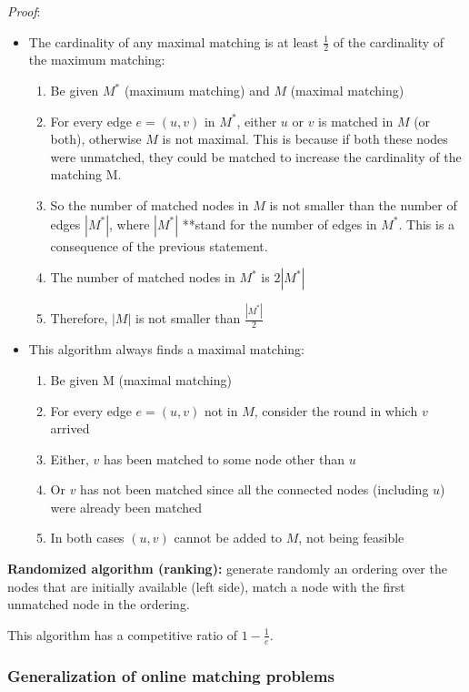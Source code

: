\documentclass[10pt,a4paper]{article}
\begin{document}
\textit{Proof}:

\begin{itemize}

\item The cardinality of any maximal matching is at least $\frac{1}{2}$ of the cardinality of the maximum matching:
\begin{enumerate}
\item Be given $M^*$ (maximum matching) and $M$ (maximal matching)
\item For every edge $e = (u,v)$ in $M^*$, either $u$ or $v$ is matched in $M$ (or both), otherwise $M$ is not maximal. This is because if both these nodes were unmatched, they could be matched to increase the cardinality of the matching M.
\item So the number of matched nodes in $M$ is not smaller than the number of edges $|M^*|$, where $|M^*|$ **stand for the number of edges in $M^*$. This is a consequence of the previous statement.
\item The number of matched nodes in $M^*$ is $2|M^*|$
\item Therefore, $|M|$ is not smaller than $\frac{|M^*|}{2}$
\end{enumerate}
\item This algorithm always finds a maximal matching:
\begin{enumerate}
\item Be given M (maximal matching)
\item For every edge $e = (u,v)$ not in $M$, consider the round in which $v$ arrived
\item Either, $v$ has been matched to some node other than $u$
\item Or $v$ has not been matched since all the connected nodes (including $u$) were already been matched
\item In both cases $(u,v)$ cannot be added to $M$, not being feasible
\end{enumerate}
\end{itemize}

\textbf{Randomized algorithm (ranking):} generate randomly an ordering over the nodes that are initially available (left side), match a node with the first unmatched node in the ordering.

This algorithm has a competitive ratio of $1-\frac{1}{e}$.

\subsubsection{Generalization of online matching problems}\label{generalization-of-online-matching-problems}
\end{document}
